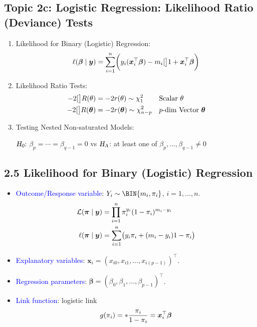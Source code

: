 \documentclass[oneside]{book}\usepackage[]{graphicx}\usepackage[svgnames]{xcolor}
\let\exp\relax%
\let\log\relax%
\newcommand{\HN}{\textsl{H}_{\textsl{0}}}%
\newcommand{\HA}{\textsl{H}_{\textsl{A}}}%
\providecommand{\Vector}[1]{\bm{#1}}%
\begin{document}
\subsection*{Topic 2c: Logistic Regression: Likelihood Ratio (Deviance) Tests}
\begin{enumerate}[1.]
      \item Likelihood for Binary (Logistic) Regression:
            \[ \ell(\Vector{\beta}\mid \Vector{y})=\sum_{i=1}^{n} \biggl(y_i(\Vector{x}_i^\top \Vector{\beta})-m_i\log[\big]{1+\exp{\Vector{x}_i^\top \Vector{\beta}}}\biggr) \]
      \item Likelihood Ratio Tests:
            \begin{align*}
                  -2\log[\big]{R(\theta)}          & =-2r(\theta)                  \sim \chi^2_1 &  & \text{Scalar $\theta$}                      \\
                  -2\log[\big]{R(\Vector{\theta})} & =-2r(\Vector{\theta})  \sim \chi^2_{n-p}    &  & \text{$ p $-dim Vector $ \Vector{\theta} $}
            \end{align*}
      \item Testing Nested Non-saturated Models:
            \begin{center}
                  $ \HN $: $ \beta_p=\cdots=\beta_{q-1}=0 $ vs $ \HA $: at least one of $ \beta_p,\ldots,\beta_{q-1}\ne 0 $
            \end{center}
\end{enumerate}
\subsection*{2.5 Likelihood for Binary (Logistic) Regression}
\begin{itemize}
      \item \textcolor{Blue}{Outcome/Response variable}: $ Y_i \sim \BIN{m_i,\pi_i} $, $ i=1,\ldots, n $.
            \begin{align*}
                  \mathcal{L}(\Vector{\pi}\mid \Vector{y}) & =\prod_{i=1}^n \pi_i^{y_i}(1-\pi_i)^{m_i-y_i}                     \\
                  \ell(\Vector{\pi}\mid \Vector{y})        & =\sum_{i=1}^{n} \bigl(y_i\log{\pi_i}+(m_i-y_i)\log{1-\pi_i}\bigr)
            \end{align*}
      \item \textcolor{Blue}{Explanatory variables}: $ \Vector{x}_i=(x_{i0},x_{i1},\ldots,x_{i(p-1)})^\top $.
      \item \textcolor{Blue}{Regression parameters}: $ \Vector{\beta}=(\beta_0,\beta_1,\ldots,\beta_{p-1})^\top $.
      \item \textcolor{Blue}{Link function}: logistic link
            \[ g(\pi_i)=\log*{\frac{\pi_i}{1-\pi_i}}=\Vector{x}_i^\top \Vector{\beta} \]
\end{itemize}
\end{document}
